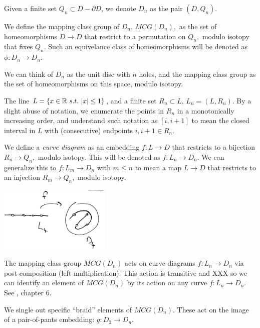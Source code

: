 \documentclass[12pt,a4paper]{article}
\begin{document}
Given a finite set $ Q_n \subset D-\partial D$,
we denote $D_n$ as the pair $(D, Q_n).$

We define the mapping class group of $D_n$,
$MCG(D_n),$ as the set of homeomorphisms $D\to D$ that
restrict to a permutation on $Q_n,$ modulo isotopy that
fixes $Q_n.$
Such an equivelance class
of homeomorphisms will be denoted as $\phi:D_n\to D_n.$

We can think of $D_n$ as the unit disc with $n$ holes,
and the mapping class group as the set of homeomorphisms on
this space, modulo isotopy.

The line $L = \{ x\in \mathbb{R}\ s.t.\ |x|\leq 1 \} $,
and a finite set $R_n\subset L$,
$L_n = (L, R_n).$
By a slight abuse of notation, we enumerate the points in $R_n$ 
in a monotonically increasing order,
and understand such notation as $[i, i+1]$ to mean the closed interval in $L$
with (consecutive) endpoints $i, i+1 \in R_n.$

We define a {\it curve diagram} as an embedding $f : L\to D$ that
restricts to a bijection $R_n\to Q_n,$ modulo
isotopy.
This will be denoted as $f : L_n\to D_n.$
We can generalize this to $f : L_m\to D_n$ with $m\leq n$
to mean a map $L\to D$ that restricts to an injection $R_m\to Q_n,$
modulo isotopy.

\begin{center}
\includegraphics[width=0.4\textwidth]{curve-diagram.eps}
\end{center}




The mapping class group $MCG(D_n)$ acts on curve diagrams $f : L_n\to D_n$
via post-composition (left multiplication).
This action is transitive and XXX so we can identify an element of
$MCG(D_n)$ by its action on any curve $f:L_n\to D_n.$
See \cite{Dehornoy02}, chapter 6.


We single out specific ``braid'' elements of $MCG(D_n)$.
These act on the image of a pair-of-pants embedding: $g:D_2\to D_n.$
\end{document}

